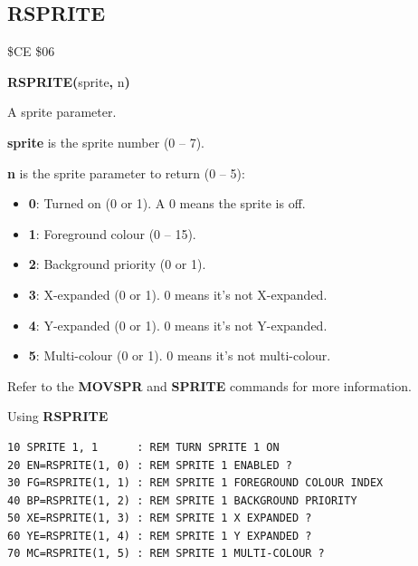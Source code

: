 \subsection{RSPRITE}
\begin{description}[leftmargin=2cm,style=nextline]
\item [Token:]    \$CE \$06

\item [Format:]   {\bf RSPRITE(}sprite{\bf,} n{\bf)}

\item [Returns:]  A sprite parameter.

                  {\bf sprite} is the sprite number (0 -- 7).

                  {\bf n} is the sprite parameter to return (0 -- 5):

                  \begin{itemize}
                     \item {\bf 0}: Turned on (0 or 1). A 0 means the sprite is off.
                     \item {\bf 1}: Foreground colour (0 -- 15).
                     \item {\bf 2}: Background priority (0 or 1).
                     \item {\bf 3}: X-expanded (0 or 1). 0 means it's not X-expanded.
                     \item {\bf 4}: Y-expanded (0 or 1). 0 means it's not Y-expanded.
                     \item {\bf 5}: Multi-colour (0 or 1). 0 means it's not multi-colour.
                  \end{itemize}

\item [Remarks:]  Refer to the {\bf MOVSPR} and {\bf SPRITE} commands for more information.

\item [Example:]  Using {\bf RSPRITE}

\begin{tcolorbox}[colback=black,coltext=white]
\verbatimfont{\codefont}
\begin{verbatim}
10 SPRITE 1, 1      : REM TURN SPRITE 1 ON
20 EN=RSPRITE(1, 0) : REM SPRITE 1 ENABLED ?
30 FG=RSPRITE(1, 1) : REM SPRITE 1 FOREGROUND COLOUR INDEX
40 BP=RSPRITE(1, 2) : REM SPRITE 1 BACKGROUND PRIORITY
50 XE=RSPRITE(1, 3) : REM SPRITE 1 X EXPANDED ?
60 YE=RSPRITE(1, 4) : REM SPRITE 1 Y EXPANDED ?
70 MC=RSPRITE(1, 5) : REM SPRITE 1 MULTI-COLOUR ?
\end{verbatim}
\end{tcolorbox}
\end{description}

